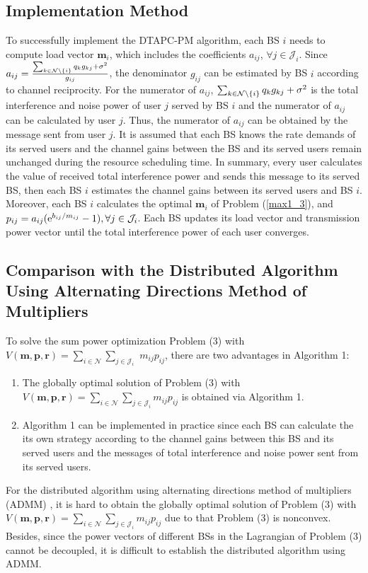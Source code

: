\documentclass[journal]{IEEEtran}
\begin{document}
\subsection{Implementation Method}
To successfully implement the DTAPC-PM algorithm, each BS $i$ needs to compute load vector $\pmb m_i$, which includes the coefficients $a_{ij}$, $\forall j \in \mathcal J_i$.
Since $a_{ij}=\frac{\sum_{k \in {\cal{N}}\setminus \{i\}}  q_k g_{kj} +\sigma ^2}
{g_{ij}}$,
the denominator $g_{ij}$ can be estimated by BS $i$ according to channel reciprocity.
For the numerator of $a_{ij}$, ${\sum_{k \in {\cal{N}}\setminus \{i\}}  q_k g_{kj} +\sigma ^2}$ is the total interference and noise power of user $j$ served by BS $i$ and the numerator of $a_{ij}$ can be calculated by user $j$.
Thus, the numerator of $a_{ij}$ can be obtained by the message sent from user $j$.
It is assumed that each BS knows the rate demands of its served users and the channel gains between the BS and its served users remain unchanged during the resource scheduling time.
In summary, every user calculates the value of received total interference power and sends this message to its served BS, then each BS $i$ estimates the channel gains between its served users and BS $i$.
Moreover, each BS $i$ calculates the optimal $\pmb m_i$ of Problem (\ref{max1_3}), and $p_{ij}=a_{ij} ( \text e^{b_{ij}/ m_{ij} }-1 ), \forall j \in \mathcal J_i$.
Each BS updates its load vector and transmission power vector until the total interference power of each user converges.

\subsection{Comparison with the Distributed Algorithm Using Alternating Directions Method of Multipliers}


To solve the sum power optimization Problem (3) with $V(\pmb m, \pmb p, \pmb r)=\sum_{i \in \mathcal N} \sum_{j\in\mathcal J_i}$ $m_{ij}p_{ij}$, there are two advantages in Algorithm 1:
\begin{enumerate}
  \item The globally optimal solution of Problem (3) with $V(\pmb m, \pmb p, \pmb r)=\sum_{i \in \mathcal N} \sum_{j\in\mathcal J_i}m_{ij}p_{ij}$ is obtained via Algorithm 1.
  \item Algorithm 1 can be implemented in practice since each BS can calculate the its own strategy according to the channel gains between this BS and its served users and the messages of total interference and noise power sent from its served users.
\end{enumerate}
For the distributed algorithm using alternating directions method of multipliers (ADMM) \cite{6484993,6156468,6748974}, it is hard to obtain the globally optimal solution of Problem (3) with $V(\pmb m, \pmb p, \pmb r)=\sum_{i \in \mathcal N} \sum_{j\in\mathcal J_i}m_{ij}p_{ij}$ due to that Problem (3) is nonconvex.
Besides, since the power vectors of different BSs in the Lagrangian of Problem (3) cannot be decoupled, it is difficult to establish the distributed algorithm using ADMM.
\end{document}

